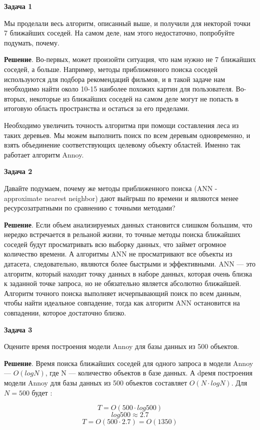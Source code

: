 \textbf{Задача 1}

Мы проделали весь алгоритм, описанный выше, и получили для некторой точки 7 ближайших соседей. На самом деле, нам этого недостаточно, попробуйте подумать, почему. 

\textbf{Решение}. Во-первых, может произойти ситуация, что нам нужно не 7 ближайших соседей, а больше.  Например, методы приближенного поиска соседей используются для подбора рекомендаций фильмов, и в такой задаче нам необходимо найти около 10-15 наиболее похожих картин для пользователя. 
Во-вторых, некоторые из ближайших соседей на самом деле могут не попасть в итоговую область пространства и остаться за его пределами. 

Необходимо увеличить точность алгоритма при помощи составления леса из таких деревьев. Мы можем выполнить поиск по всем деревьям одновременно, и взять объединение соответствующих целевому объекту областей. Именно так работает алгоритм Annoy. 

\textbf{Задача 2}

Давайте подумаем, почему же методы приближенного поиска (ANN - approximate nearest neighbor) дают выйгрыш по времени и являются менее ресурсозатратными по сравнению с точными методами?

\textbf{Решение}. Если объем анализируемых данных становится слишком большим, что нередко встречается в рельаной жизни, то точные методы поиска ближайших соседей будут просматривать всю выборку данных, что займет огромное количество времени. А алгоритмы ANN не просматривают все объекты из датасета, следовательно, являются более быстрыми и эффективными. ANN — это алгоритм, который находит точку данных в наборе данных, которая очень близка к заданной точке запроса, но не обязательно является абсолютно ближайшей. Алгоритм точного поиска выполняет исчерпывающий поиск по всем данным, чтобы найти идеальное совпадение, тогда как алгоритм ANN остановится на совпадении, которое достаточно близко.

\textbf{Задача 3}

Оцените время построения модели Annoy для базы данных из 500 объектов.

\textbf{Решение}. Время поиска ближайших соседей для одного запроса в модели Annoy — $O(logN)$, где N — количество объектов в базе данных. А dремя построения модели Annoy для базы данных из 500 объектов составляет $O(N\cdot logN)$. Для $N = 500$ будет :

\[
    T = O(500 \cdot log500) 
\]
\[
    log500 \approx 2.7 
\]
\[
    T = O(500 \cdot 2.7) = O(1350)
\]

